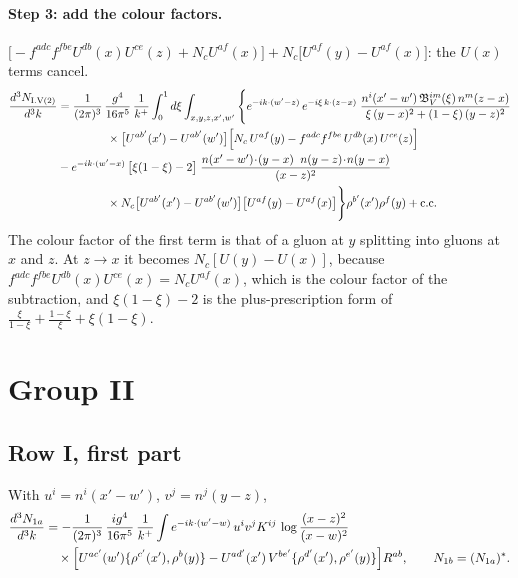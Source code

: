 \documentclass[10pt]{article}
\numberwithin{equation}{section}
\begin{document}
\paragraph{Step 3: add the colour factors.}
$\big[-f^{adc}f^{fbe}U^{db}(x)U^{ce}(z)+N_{c}U^{af}(x)\big]+N_{c}\big[U^{af}(y)-U^{af}(x)\big]$: the $U(x)$ terms cancel.
\begin{align}
\frac{d^{3}N_{\rm I.V(2)}}{d^{3}k}&=\frac{1}{(2\pi)^{3}}\,\frac{g^{4}}{16\pi^{5}}\,\frac{1}{k^{+}}\int_{0}^{1}d\xi\int_{x,y,z,x',w'}\Bigg\{
e^{-ik\cdot(w'-z)}\,e^{-i\xi\,k\cdot(z-x)}\;\frac{n^{i}(x'-w')\,\mathfrak{B}_{V}^{im}(\xi)\,n^{m}(z-x)}{\xi\,(y-x)^{2}+(1-\xi)\,(y-z)^{2}}\notag\\
&\hspace{1.5cm}\times\big[U^{ab'}(x')-U^{ab'}(w')\big]\Big[N_{c}\,U^{af}(y)-f^{adc}f^{fbe}\,U^{db}(x)\,U^{ce}(z)\Big]\notag\\
&-e^{-ik\cdot(w'-x)}\,\big[\xi(1-\xi)-2\big]\;\frac{n(x'-w')\!\cdot\!(y-x)\;\;n(y-z)\!\cdot\!n(y-x)}{(x-z)^{2}}\notag\\
&\hspace{1.5cm}\times N_{c}\big[U^{ab'}(x')-U^{ab'}(w')\big]\big[U^{af}(y)-U^{af}(x)\big]\Bigg\}\rho^{b'}(x')\rho^{f}(y)+{\rm c.c.} \label{eq:RowV2}
\end{align}
The colour factor of the first term is that of a gluon at $y$ splitting into gluons at $x$ and $z$. At $z\to x$ it becomes $N_{c}[U(y)-U(x)]$, because $f^{adc}f^{fbe}U^{db}(x)U^{ce}(x)=N_{c}U^{af}(x)$, which is the colour factor of the subtraction, and $\xi(1-\xi)-2$ is the plus-prescription form of $\tfrac{\xi}{1-\xi}+\tfrac{1-\xi}{\xi}+\xi(1-\xi)$.

\section{Group II}

\subsection{Row I, first part}
With $u^{i}=n^{i}(x'-w')$, $v^{j}=n^{j}(y-z)$,
\begin{align}
\frac{d^{3}N_{1a}}{d^{3}k}&=-\frac{1}{(2\pi)^{3}}\,\frac{ig^{4}}{16\pi^{5}}\,\frac{1}{k^{+}}\int e^{-ik\cdot(w'-w)}\,u^{i}v^{j}K^{ij}\,\log\frac{(x-z)^{2}}{(x-w)^{2}}\notag\\
&\quad\times\Big[U^{ac'}(w')\{\rho^{c'}(x'),\rho^{b}(y)\}-U^{ad'}(x')\,V^{be'}\{\rho^{d'}(x'),\rho^{e'}(y)\}\Big]R^{ab},\qquad N_{1b}=(N_{1a})^{*}. \label{eq:GII1}
\end{align}
\end{document}
